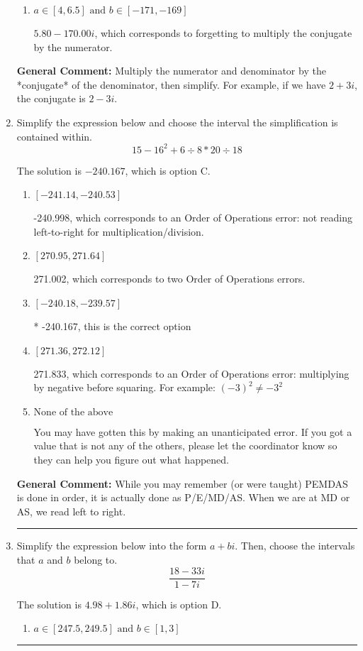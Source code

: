 \documentclass{extbook}[14pt]
\newcommand{\litem}[1]{\item #1

\rule{\textwidth}{0.4pt}}
\begin{document}
\begin{enumerate}
{\begin{enumerate}[label=\Alph*.]
* $5.80  - 3.40 i$, which is the correct option.
\item \( a \in [4, 6.5] \text{ and } b \in [-171, -169] \)

 $5.80  - 170.00 i$, which corresponds to forgetting to multiply the conjugate by the numerator.
\end{enumerate}

\textbf{General Comment:} Multiply the numerator and denominator by the *conjugate* of the denominator, then simplify. For example, if we have $2+3i$, the conjugate is $2-3i$.
}
\litem{
Simplify the expression below and choose the interval the simplification is contained within.
\[ 15 - 16^2 + 6 \div 8 * 20 \div 18 \]

The solution is \( -240.167 \), which is option C.\begin{enumerate}[label=\Alph*.]
\item \( [-241.14, -240.53] \)

 -240.998, which corresponds to an Order of Operations error: not reading left-to-right for multiplication/division.
\item \( [270.95, 271.64] \)

 271.002, which corresponds to two Order of Operations errors.
\item \( [-240.18, -239.57] \)

* -240.167, this is the correct option
\item \( [271.36, 272.12] \)

 271.833, which corresponds to an Order of Operations error: multiplying by negative before squaring. For example: $(-3)^2 \neq -3^2$
\item \( \text{None of the above} \)

 You may have gotten this by making an unanticipated error. If you got a value that is not any of the others, please let the coordinator know so they can help you figure out what happened.
\end{enumerate}

\textbf{General Comment:} While you may remember (or were taught) PEMDAS is done in order, it is actually done as P/E/MD/AS. When we are at MD or AS, we read left to right.
}
\litem{
Simplify the expression below into the form $a+bi$. Then, choose the intervals that $a$ and $b$ belong to.
\[ \frac{18 - 33 i}{1 - 7 i} \]

The solution is \( 4.98  + 1.86 i \), which is option D.\begin{enumerate}[label=\Alph*.]
\item \( a \in [247.5, 249.5] \text{ and } b \in [1, 3] \)


\end{enumerate}}
\end{enumerate}
\end{document}
